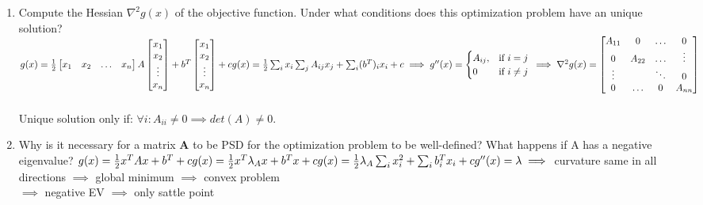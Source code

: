 \begin{enumerate}[label=(\alph*)]
	\item Compute the Hessian $\nabla^{2} g(x)$ of the objective function. Under what conditions does this optimization problem have an unique solution?
		\subitem $ g(x) = \frac{1}{2}\begin{bmatrix} x_{1} & x_{2} & \hdots & x_{n}  \end{bmatrix}A\begin{bmatrix} x_{1} \\ x_{2} \\ \vdots \\ x_{n} \end{bmatrix}
			+ b^{T}\begin{bmatrix} x_{1} \\ x_{2} \\ \vdots \\ x_{n} \end{bmatrix} + c \\
				g(x) = \frac{1}{2} \sum_{i}x_{i}\sum_{j}A_{ij}x_{j} + \sum_{i}(b^{T})_{i}x_{i} + c \implies g^{\prime\prime}(x) = \begin{cases} A_{ij},&\text{if } i = j\\ 0 & \text{if } i \neq j\end{cases} \\
			\implies \nabla^{2} g(x) = \begin{bmatrix} A_{11} & 0 & \hdots & 0 \\ 0 & A_{22} & \hdots & \vdots \\ \vdots & & \ddots & 0 \\ 0 & \hdots & 0 & A_{nn} \end{bmatrix}$ \\
			\\
			Unique solution only if: $\forall i: A_{ii}\neq 0 \implies det(A) \neq 0$.

	\item Why is it necessary for a matrix \textbf{A} to be PSD for the optimization problem to be well-defined? What happens if A has a negative eigenvalue?
		\subitem $g(x) = \frac{1}{2} x^{T}Ax + b^{T} + c\\ g(x) = \frac{1}{2} x^{T}\lambda_A  x + b^{T}x + c \\ g(x)= \frac{1}{2} \lambda_A \sum_{i}x_{i}^{2} + \sum_{i}b_{i}^{T}x_{i} + c \\ g^{\prime\prime}(x) = \lambda \implies$ curvature same in all directions $\implies$ global minimum $\implies$ convex problem \\ $\implies$ negative EV $\implies$ only sattle point


\end{enumerate}
